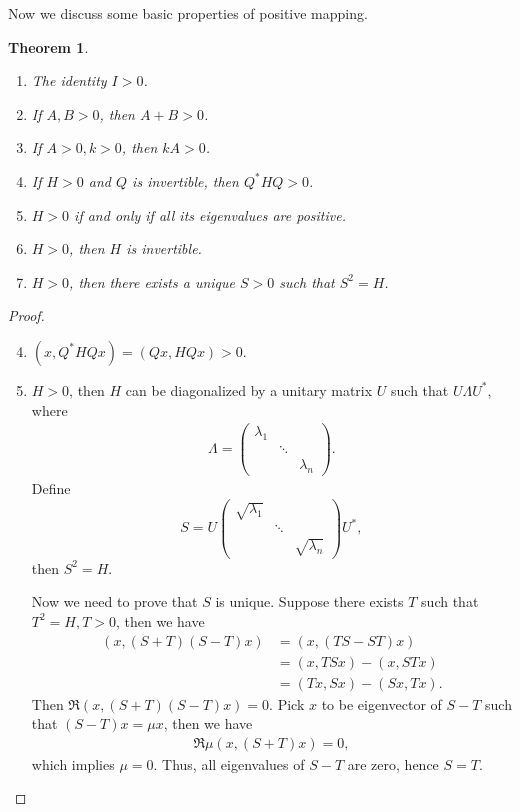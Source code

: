 \documentclass[11pt]{book}
\newtheorem{theorem}{Theorem}[chapter]
\theoremstyle{definition}
\numberwithin{equation}{chapter}
\begin{document}
\medskip

Now we discuss some basic properties of positive mapping. 

\medskip

\begin{theorem}\label{unique_square_root}
~\begin{enumerate}[label=(\alph*)]
    \item The identity $I > 0$.
    \item If $A, B > 0$, then $A + B > 0$.
    \item If $A > 0, k > 0$, then $k A > 0$.
    \item If $H > 0$ and $Q$ is invertible, then $Q^* H Q > 0$.
    \item $H > 0$ if and only if all its eigenvalues are positive.
    \item $H > 0$, then $H$ is invertible.
    \item $H > 0$, then there exists a unique $S > 0$ such that $S^2 = H$.
\end{enumerate}
\end{theorem}
\begin{proof}
~\begin{enumerate}[label=(\alph*)]
    \setcounter{enumi}{3}
    \item $(x, Q^* H Q x) = (Qx, HQx) > 0$.
    \setcounter{enumi}{6}
    \item $H > 0$, then $H$ can be diagonalized by a unitary matrix $U$ such that $U\Lambda U^*$, where 
    \begin{align*}
        \Lambda = \begin{pmatrix}
            \lambda_1 &  &  \\
            & \ddots &  \\
            &  & \lambda_n
        \end{pmatrix}.
    \end{align*}
    Define $$S = U \begin{pmatrix}
        \sqrt{\lambda_1} &  &  \\
        & \ddots &  \\
        &  & \sqrt{\lambda_n}
    \end{pmatrix} U^*,$$ 
    then $S^2  = H$. 
        
    Now we need to prove that $S$ is unique. Suppose there exists $T$ such that $T^2 = H, T > 0$, then we have
    \begin{align*}
        (x, (S+T)(S-T)x) & = (x, (TS - ST)x) \\
        & = (x, TS x) - (x, STx) \\
        & = (Tx, Sx) - (Sx, Tx).
    \end{align*}
    Then $\Re (x, (S+T)(S-T)x) = 0$. Pick $x$ to be eigenvector of $S-T$ such that $(S-T)x = \mu x$, then we have 
    \begin{align*}
        \Re \mu (x, (S+T)x) = 0,
    \end{align*}
    which implies $\mu = 0$. Thus, all eigenvalues of $S-T$ are zero, hence $S = T$.
\end{enumerate}
\end{proof}
\end{document}
